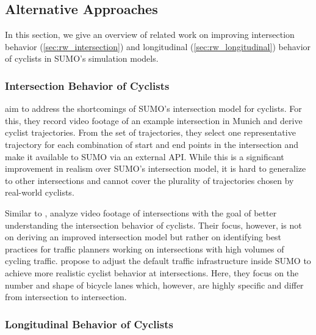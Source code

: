 \subsection{Alternative Approaches}
\label{subsec:related_work_sumo}
In this section, we give an overview of related work on improving intersection behavior (\cref{sec:rw_intersection}) and longitudinal (\cref{sec:rw_longitudinal}) behavior of cyclists in SUMO's simulation models.

\subsubsection{Intersection Behavior of Cyclists}%
\label{subsubsec:rw_intersection}

\textcite{kaths2016integration} aim to address the shortcomings of SUMO's intersection model for cyclists.
For this, they record video footage of an example intersection in Munich and derive cyclist trajectories.
From the set of trajectories, they select one representative trajectory for each combination of start and end points in the intersection and make it available to SUMO via an external API.
While this is a significant improvement in realism over SUMO's intersection model, it is hard to generalize to other intersections and cannot cover the plurality of trajectories chosen by real-world cyclists.


Similar to \textcite{kaths2016integration}, \textcite{grigoropoulos2022traffic} analyze video footage of intersections with the goal of better understanding the intersection behavior of cyclists.
Their focus, however, is not on deriving an improved intersection model but rather on identifying best practices for traffic planners working on intersections with high volumes of cycling traffic.
\textcite{grigoropoulos2019modelling} propose to adjust the default traffic infrastructure inside SUMO to achieve more realistic cyclist behavior at intersections.
Here, they focus on the number and shape of bicycle lanes which, however, are highly specific and differ from intersection to intersection.

\subsubsection{Longitudinal Behavior of Cyclists}%
\label{subsubsec:rw_longitudinal}

